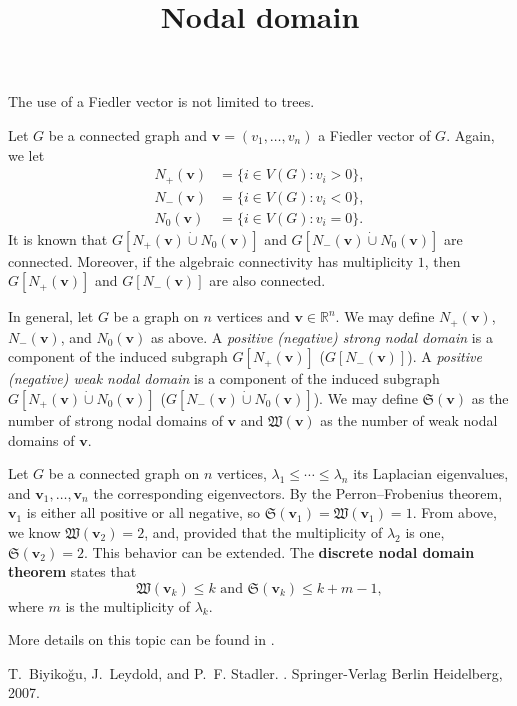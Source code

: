 \documentclass{article}
\title{Nodal domain}
\date{\vspace{-1cm}}
\newcommand{\dunion}{\mathbin{\dot\cup}}
\newcommand{\bv}{\mathbf{v}}
\theoremstyle{definition}
\begin{document}
\maketitle
\large

The use of a Fiedler vector is not limited to trees.  

Let $G$ be a connected graph and $\bv = (v_1,\ldots,v_n)$ a Fiedler vector of $G$.  Again, we let 
\[\begin{aligned}
N_+(\bv) &= \{i \in V(G): v_i > 0\}, \\ 
N_-(\bv) &= \{i \in V(G): v_i < 0\}, \\
N_0(\bv) &= \{i \in V(G): v_i = 0\}.
\end{aligned}\]
It is known that $G[N_+(\bv)\dunion N_0(\bv)]$ and $G[N_-(\bv)\dunion N_0(\bv)]$ are connected.  Moreover, if the algebraic connectivity has multiplicity $1$, then $G[N_+(\bv)]$ and $G[N_-(\bv)]$ are also connected.

In general, let $G$ be a graph on $n$ vertices and $\bv\in\mathbb{R}^n$.  We may define $N_+(\bv)$, $N_-(\bv)$, and $N_0(\bv)$ as above.  A \emph{positive (negative) strong nodal domain} is a component of the induced subgraph $G[N_+(\bv)]$ ($G[N_-(\bv)]$).  A \emph{positive (negative) weak nodal domain} is a component of the induced subgraph $G[N_+(\bv)\dunion N_0(\bv)]$ ($G[N_-(\bv)\dunion N_0(\bv)]$).  
We may define $\mathfrak{S}(\bv)$ as the number of strong nodal domains of $\bv$ and $\mathfrak{W}(\bv)$ as the number of weak nodal domains of $\bv$.  

Let $G$ be a connected graph on $n$ vertices, $\lambda_1 \leq \cdots \leq \lambda_n$ its Laplacian eigenvalues, and $\bv_1,\ldots,\bv_n$ the corresponding eigenvectors.  By the Perron--Frobenius theorem, $\bv_1$ is either all positive or all negative, so $\mathfrak{S}(\bv_1) = \mathfrak{W}(\bv_1) = 1$.  From above, we know $\mathfrak{W}(\bv_2) = 2$, and, provided that the multiplicity of $\lambda_2$ is one, $\mathfrak{S}(\bv_2) = 2$.  This behavior can be extended.  The \textbf{discrete nodal domain theorem} states that 
\[\mathfrak{W}(\bv_k) \leq k \text{ and } \mathfrak{S}(\bv_k) \leq k + m - 1,\]
where $m$ is the multiplicity of $\lambda_k$.

More details on this topic can be found in \cite{BLS07}.

\begin{thebibliography}{9}
T.~Biyiko{\u g}u, J.~Leydold, and P.~F. Stadler.
.
\newblock Springer-Verlag Berlin Heidelberg, 2007.
\end{thebibliography}
\end{document}
